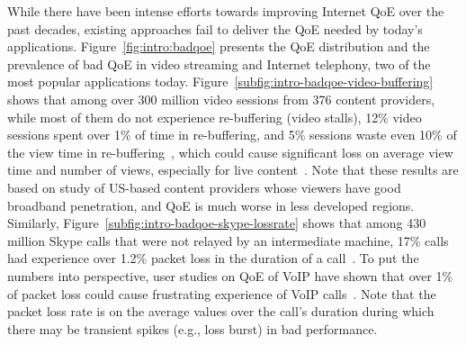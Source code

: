  While there have been intense efforts towards improving Internet 
QoE over the past decades, existing approaches fail to deliver the 
QoE needed by today's applications. 
Figure~\ref{fig:intro:badqoe} presents the QoE distribution and the 
prevalence of bad QoE in video streaming and Internet telephony, 
two of the most popular applications today.
Figure~\ref{subfig:intro-badqoe-video-buffering} shows that among 
over 300 million video sessions from 376 content 
providers, while most of them do not experience re-buffering 
(video stalls), 12\% video sessions spent over 1\% of time in re-buffering,
and 5\% sessions waste even 10\% of the view time in 
re-buffering~\cite{jiang2013shedding}, which could cause significant 
loss on average view time and number of views, especially for 
live content~\cite{sigcomm11}. 
Note that these results are based on study of US-based content 
providers whose viewers have good broadband penetration, 
and QoE is much worse in less developed regions.
Similarly, Figure~\ref{subfig:intro-badqoe-skype-lossrate} shows that 
among 430 million Skype calls that were not relayed by an intermediate
machine, 17\% calls had experience over 1.2\% packet loss in the 
duration of a call~\cite{via}. 
To put the numbers into perspective, user studies on QoE of VoIP have 
shown that over 1\% of packet loss could cause frustrating experience
of VoIP calls~\cite{itu,cisco-voip}.
Note that the packet loss rate is on the average values over the
call's duration during which there may be transient spikes
(e.g., loss burst) in bad performance.


